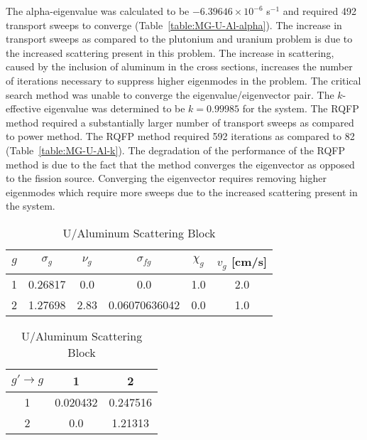 The alpha-eigenvalue was calculated to be $-6.39646 \times 10^{-6}$ s$^{-1}$ and required 492 transport sweeps to converge (Table~\ref{table:MG-U-Al-alpha}). The increase in transport sweeps as compared to the plutonium and uranium problem is due to the increased scattering present in this problem. The increase in scattering, caused by the inclusion of aluminum in the cross sections, increases the number of iterations necessary to suppress higher eigenmodes in the problem. The critical search method was unable to converge the eigenvalue/eigenvector pair. The $k$-effective eigenvalue was determined to be $k=0.99985$ for the system. The RQFP method required a substantially larger number of transport sweeps as compared to power method. The RQFP method required 592 iterations as compared to 82 (Table~\ref{table:MG-U-Al-k}). The degradation of the performance of the RQFP method is due to the fact that the method converges the eigenvector as opposed to the fission source. Converging the eigenvector requires removing higher eigenmodes which require more sweeps due to the increased scattering present in the system. 

\begin{table}[!htbp]
	\caption{Two-Group Uranium/Aluminum Problem Cross Sections (cm$^{-1}$)}
	\label{table:U-Al}
	\begin{subtable}[h]{1.0\textwidth}
		\centering{}
		\begin{tabular}{@{}cccccc@{}}\toprule
			$g$ & $\sigma_{g} $ & $\nu_{g}$ & $\sigma_{fg}$ & $\chi_{g}$ & $v_{g}$ [cm/s] \\ 
        			\midrule
			1 & 0.26817 & 0.0 & 0.0 & 1.0 & 2.0 \\
			2 & 1.27698 & 2.83 & 0.06070636042 & 0.0 & 1.0 \\
			\bottomrule
		\end{tabular}
	\caption{U/Aluminum Cross Sections}
	\label{table:TwoGroupU-Al}
	\end{subtable}%
	\vspace{0.25cm}
	\begin{subtable}[h]{1.0\textwidth}
	\centering{}
	\begin{tabular}{@{}ccc@{}}\toprule
	$g' \rightarrow g$ & 1 & 2 \\ 
        \midrule
	1 & 0.020432 & 0.247516  \\
	2 & 0.0 & 1.21313 \\
	\bottomrule
	\end{tabular}
	\caption{U/Aluminum Scattering Block}
	\label{table:TwoGroupU-Al_ScatterXS}
	\end{subtable}
\end{table}


